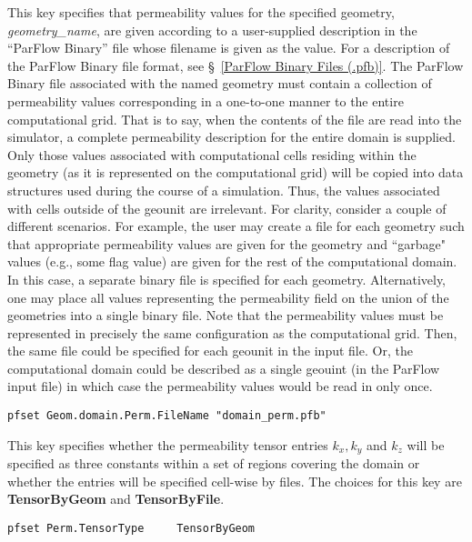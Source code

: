 {
This key specifies that permeability values for the specified geometry,
{\em geometry\_name}, are given according to a user-supplied description
in the ``ParFlow Binary'' file whose filename is given as the value.
For a description of the ParFlow Binary file format, see
\S~\ref{ParFlow Binary Files (.pfb)}.  The ParFlow Binary file
associated with the named geometry must contain a collection of
permeability values corresponding in a one-to-one manner to the entire
computational grid.  That is to say, when the contents of the file are
read into the simulator, a complete permeability description for the
entire domain is supplied.  Only those values associated with
computational cells residing within the geometry (as it is represented
on the computational grid) will be copied into data structures used
during the course of a simulation.  Thus, the values associated with
cells outside of the geounit are irrelevant.  For clarity, consider a
couple of different scenarios.  For example, the user may create a file
for each geometry such that appropriate permeability values are given
for the geometry and ``garbage" values (e.g., some flag value) are given
for the rest of the computational domain. In this case, a separate
binary file is specified for each geometry.  Alternatively, one may
place all values representing the permeability field on the union of the
geometries into a single binary file.  Note that the permeability values
must be represented in precisely the same configuration as the
computational grid. Then, the same file could be specified for each
geounit in the input file.  Or, the computational domain could be
described as a single geouint (in the ParFlow input file) in which case
the permeability values would be read in only once.
}
\begin{display}\begin{verbatim}
pfset Geom.domain.Perm.FileName "domain_perm.pfb"
\end{verbatim}\end{display}

{
This key specifies whether the permeability tensor entries $k_x, k_y$ and $k_z$
will be specified as three constants within a set of regions covering the
domain or whether the entries will be specified cell-wise by files.
The choices
for this key are {\bf TensorByGeom} and {\bf TensorByFile}.
}
\begin{display}\begin{verbatim}
pfset Perm.TensorType     TensorByGeom
\end{verbatim}\end{display}

